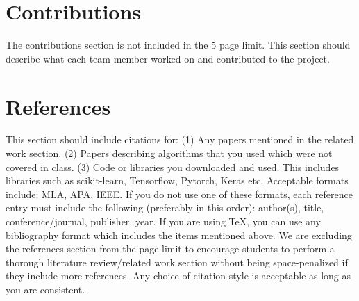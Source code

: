 \documentclass{article}
\begin{document}
\section{Contributions}
The contributions section is not included in the 5 page limit. This section should describe
what each team member worked on and contributed to the project.



\section*{References}

This section should include citations for: (1) Any papers mentioned in the related work
section. (2) Papers describing algorithms that you used which were not covered in class.
(3) Code or libraries you downloaded and used. This includes libraries such as scikit-learn, Tensorflow, Pytorch, Keras etc. Acceptable formats include: MLA, APA, IEEE. If you
do not use one of these formats, each reference entry must include the following (preferably
in this order): author(s), title, conference/journal, publisher, year. If you are using TeX,
you can use any bibliography format which includes the items mentioned above. We are excluding
the references section from the page limit to encourage students to perform a thorough
literature review/related work section without being space-penalized if they include more
references. Any choice of citation style is acceptable
as long as you are consistent. 

\medskip



\end{document}
